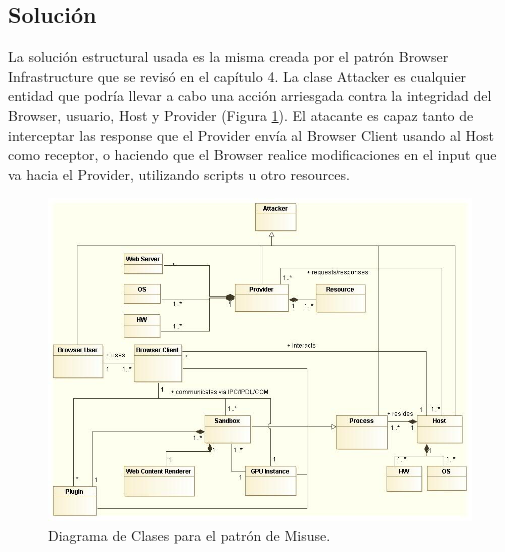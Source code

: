 \subsection{Solución}
La solución estructural usada es la misma creada por el patrón Browser Infrastructure que se revisó en el capítulo 4. La clase Attacker es cualquier entidad que podría llevar a cabo una acción arriesgada contra la integridad del Browser, usuario, Host y Provider (Figura \ref{fig:BIMisuse}). El atacante es capaz tanto de interceptar las response que el Provider envía al Browser Client usando al Host como receptor, o haciendo que el Browser realice modificaciones en el input que va hacia el Provider, utilizando scripts u otro resources.
\begin{landscape}
\begin{figure}[h!t]
	        \centering
	        \includegraphics[scale=0.62]{figures/chap5/patronMisuse_v2.jpg}
	        \caption{Diagrama de Clases para el patrón de Misuse.}
	        \label{fig:BIMisuse}
    \end{figure}
\end{landscape}

